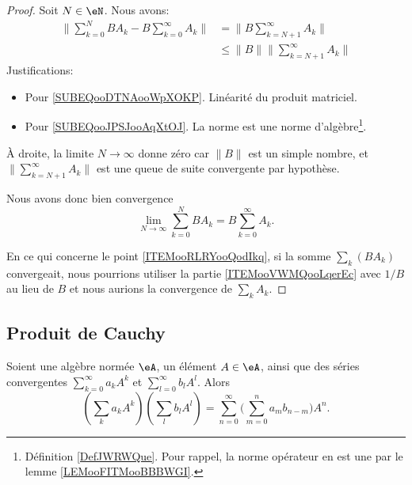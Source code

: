 \begin{proof}
	Soit \( N\in \eN\). Nous avons:
	\begin{subequations}
		\begin{align}
			\| \sum_{k=0}^NBA_k-B\sum_{k=0}^{\infty}A_k \| & =\| B\sum_{k=N+1}^{\infty}A_k \|            \label{SUBEQooDTNAooWpXOKP} \\
			                                               & \leq \| B \|\| \sum_{k=N+1}^{\infty}A_k \|  \label{SUBEQooJPSJooAqXtOJ}
		\end{align}
	\end{subequations}
	Justifications:
	\begin{itemize}
		\item Pour \eqref{SUBEQooDTNAooWpXOKP}. Linéarité du produit matriciel.
		\item Pour \eqref{SUBEQooJPSJooAqXtOJ}. La norme est une norme d'algèbre\footnote{Définition \ref{DefJWRWQue}. Pour rappel, la norme opérateur en est une par le lemme \ref{LEMooFITMooBBBWGI}.}.
	\end{itemize}
	À droite, la limite \( N\to \infty\) donne zéro car \( \| B \|\) est un simple nombre, et \( \| \sum_{k=N+1}^{\infty}A_k \|\) est une queue de suite convergente par hypothèse.

	Nous avons donc bien convergence
	\begin{equation}
		\lim_{N\to \infty}\sum_{k=0}^{N}BA_k=B\sum_{k=0}^{\infty}A_k.
	\end{equation}

	En ce qui concerne le point \ref{ITEMooRLRYooQodIkq}, si la somme \( \sum_k(BA_k)\) convergeait, nous pourrions utiliser la partie \ref{ITEMooVWMQooLqerEc} avec \( 1/B\) au lieu de \( B\) et nous aurions la convergence de \( \sum_kA_k\).
\end{proof}


\subsection{Produit de Cauchy}


\begin{proposition}      \label{PROPooFMEXooCNjdhS}
	Soient une algèbre normée \( \eA\), un élément \( A\in \eA\), ainsi que des séries convergentes \( \sum_{k=0}^{\infty}a_kA^k\) et \( \sum_{l=0}^{\infty}b_lA^l\). Alors
	\begin{equation}
		\left( \sum_ka_kA^k \right)\left( \sum_lb_lA^l \right)=\sum_{n=0}^{\infty}\big( \sum_{m=0}^na_mb_{n-m} \big)A^n.
	\end{equation}
\end{proposition}


